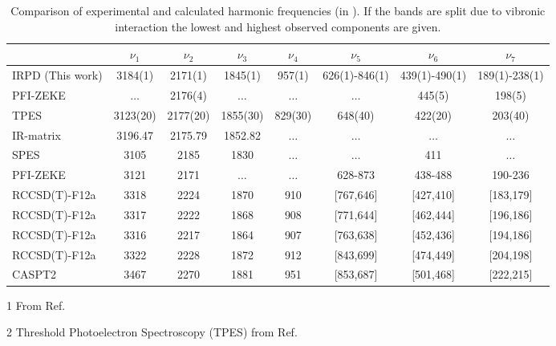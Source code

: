\clearpage
\begin{landscape}
    
\begin{table}
\caption{\label{tab:exp-calc}Comparison of experimental and calculated harmonic frequencies (in \wn). If the bands are split due to vibronic interaction the lowest and highest observed components are given.}
\begin{threeparttable}

        \begin{tabular}{l c c c c c c c}
          & $\nu_1$ & $\nu_2$ & $\nu_3$ & $\nu_4$ & $\nu_5$ & $\nu_6$ & $\nu_7$\\
        \hline
        IRPD (This work) & 3184(1) & 2171(1) & 1845(1) & 957(1) & 626(1)-846(1) & 439(1)-490(1) & 189(1)-238(1)\\
        PFI-ZEKE \tnote{1} & $\ldots$ & 2176(4) & $\ldots$ & $\ldots$ & $\ldots$ & 445(5) & 198(5)\\
        TPES \tnote{2}  & 3123(20) & 2177(20) & 1855(30) & 829(30) & 648(40) & 422(20) & 203(40)\\
        IR-matrix \tnote{3}  & 3196.47 & 2175.79 & 1852.82 & $\ldots$ & $\ldots$ & $\ldots$ & $\ldots$\\
        SPES \tnote{4} & 3105 & 2185 & 1830 & $\ldots$ & $\ldots$ & 411 & $\ldots$\\
        PFI-ZEKE \tnote{5} & 3121 & 2171 & $\ldots$ & $\ldots$ & 628-873 &  438-488 & 190-236\\
        \hline
        RCCSD(T)-F12a \tnote{6}& 3318 & 2224 & 1870 & 910 & [767,646] & [427,410] & [183,179]\\
        RCCSD(T)-F12a \tnote{7} & 3317 & 2222 & 1868 & 908 & [771,644] & [462,444] & [196,186]\\
        RCCSD(T)-F12a \tnote{8}& 3316 & 2217 & 1864 & 907 & [763,638] & [452,436] & [194,186]\\
        RCCSD(T)-F12a \tnote{9} & 3322 & 2228 & 1872 & 912 & [843,699] & [474,449] & [204,198]\\
        CASPT2 \tnote{10} & 3467 & 2270 & 1881 & 951 & [853,687] & [501,468] & [222,215]
        \end{tabular}
    \begin{tablenotes}
        \item[1] From Ref.\ \cite{Gans2016ExperimentalSpectroscopy} 
        \item[2] Threshold Photoelectron Spectroscopy (TPES) from Ref.\ \cite{Desrier2016ExperimentalSpectroscopy}

\end{tablenotes}
\end{threeparttable}
\end{table}
\end{landscape}
